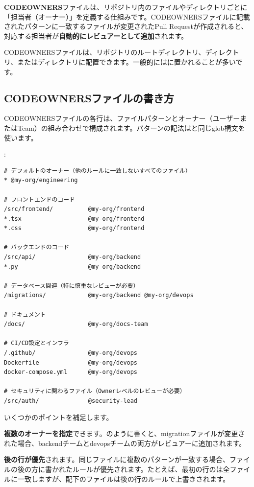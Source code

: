 \textbf{CODEOWNERS}ファイルは、リポジトリ内のファイルやディレクトリごとに「担当者（オーナー）」を定義する仕組みです。CODEOWNERSファイルに記載されたパターンに一致するファイルが変更されたPull Requestが作成されると、対応する担当者が\textbf{自動的にレビュアーとして追加}されます。

CODEOWNERSファイルは、リポジトリのルートディレクトリ、ディレクトリ、またはディレクトリに配置できます。一般的にはに置かれることが多いです。

\subsection{CODEOWNERSファイルの書き方}

CODEOWNERSファイルの各行は、ファイルパターンとオーナー（ユーザーまたはTeam）の組み合わせで構成されます。パターンの記法はと同じglob構文を使います。

:
\begin{lstlisting}[language={}]
# デフォルトのオーナー（他のルールに一致しないすべてのファイル）
* @my-org/engineering

# フロントエンドのコード
/src/frontend/          @my-org/frontend
*.tsx                   @my-org/frontend
*.css                   @my-org/frontend

# バックエンドのコード
/src/api/               @my-org/backend
*.py                    @my-org/backend

# データベース関連（特に慎重なレビューが必要）
/migrations/            @my-org/backend @my-org/devops

# ドキュメント
/docs/                  @my-org/docs-team

# CI/CD設定とインフラ
/.github/               @my-org/devops
Dockerfile              @my-org/devops
docker-compose.yml      @my-org/devops

# セキュリティに関わるファイル（Ownerレベルのレビューが必要）
/src/auth/              @security-lead
\end{lstlisting}

いくつかのポイントを補足します。

\textbf{複数のオーナーを指定}できます。のように書くと、migrationファイルが変更された場合、backendチームとdevopsチームの両方がレビュアーに追加されます。

\textbf{後の行が優先}されます。同じファイルに複数のパターンが一致する場合、ファイルの後の方に書かれたルールが優先されます。たとえば、最初の行の\cmd{*}は全ファイルに一致しますが、配下のファイルは後の行のルールで上書きされます。

